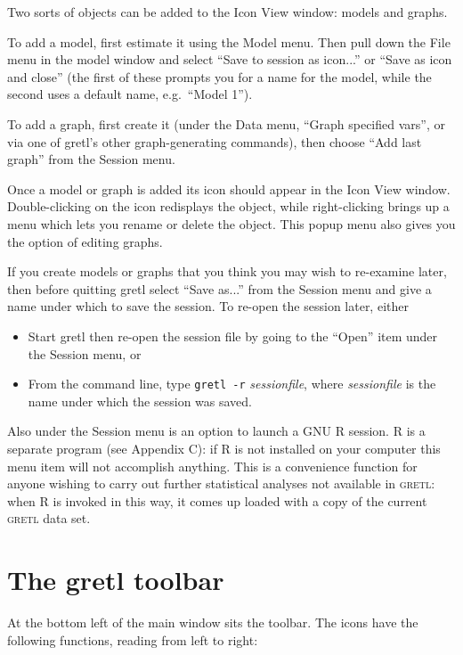 \documentclass{article}
\begin{document}
Two sorts of objects can be added to the Icon View window: models and
graphs.  

To add a model, first estimate it using the Model menu.  Then pull
down the File menu in the model window and select ``Save to session as
icon...'' or ``Save as icon and close'' (the first of these prompts
you for a name for the model, while the second uses a default name,
e.g.\ ``Model 1'').

To add a graph, first create it (under the Data menu, ``Graph
specified vars'', or via one of \textsf{gretl}'s other
graph-generating commands), then choose ``Add last graph'' from the
Session menu.

Once a model or graph is added its icon should appear in the Icon
View window.  Double-clicking on the icon redisplays the object,
while right-clicking brings up a menu which lets you rename or delete
the object.  This popup menu also gives you the option of editing graphs.

If you create models or graphs that you think you may wish to
re-examine later, then before quitting \textsf{gretl} select ``Save
as...''  from the Session menu and give a name under which to save the
session.  To re-open the session later, either

\begin{itemize}
\item Start \textsf{gretl} then re-open the session file by going to
  the ``Open'' item under the Session menu, or
\item From the command line, type \texttt{gretl -r}
  \textit{sessionfile}, where \textit{sessionfile} is the name under
  which the session was saved.
\end{itemize}

Also under the Session menu is an option to launch a GNU R session.  R
is a separate program (see Appendix C): if R is not installed on your
computer this menu item will not accomplish anything.  This is a
convenience function for anyone wishing to carry out further
statistical analyses not available in \textsc{gretl}: when R is
invoked in this way, it comes up loaded with a copy of the current
\textsc{gretl} data set.

\section{The gretl toolbar}
\label{toolbar}

At the bottom left of the main window sits the toolbar.  The icons
have the following functions, reading from left to right:  
\end{document}
